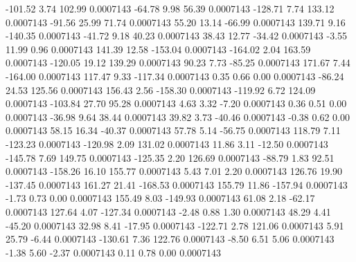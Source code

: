      -101.52        3.74      102.99     0.0007143
      -64.78        9.98       56.39     0.0007143
     -128.71        7.74      133.12     0.0007143
      -91.56       25.99       71.74     0.0007143
       55.20       13.14      -66.99     0.0007143
      139.71        9.16     -140.35     0.0007143
      -41.72        9.18       40.23     0.0007143
       38.43       12.77      -34.42     0.0007143
       -3.55       11.99        0.96     0.0007143
      141.39       12.58     -153.04     0.0007143
     -164.02        2.04      163.59     0.0007143
     -120.05       19.12      139.29     0.0007143
       90.23        7.73      -85.25     0.0007143
      171.67        7.44     -164.00     0.0007143
      117.47        9.33     -117.34     0.0007143
        0.35        0.66        0.00     0.0007143
      -86.24       24.53      125.56     0.0007143
      156.43        2.56     -158.30     0.0007143
     -119.92        6.72      124.09     0.0007143
     -103.84       27.70       95.28     0.0007143
        4.63        3.32       -7.20     0.0007143
        0.36        0.51        0.00     0.0007143
      -36.98        9.64       38.44     0.0007143
       39.82        3.73      -40.46     0.0007143
       -0.38        0.62        0.00     0.0007143
       58.15       16.34      -40.37     0.0007143
       57.78        5.14      -56.75     0.0007143
      118.79        7.11     -123.23     0.0007143
     -120.98        2.09      131.02     0.0007143
       11.86        3.11      -12.50     0.0007143
     -145.78        7.69      149.75     0.0007143
     -125.35        2.20      126.69     0.0007143
      -88.79        1.83       92.51     0.0007143
     -158.26       16.10      155.77     0.0007143
        5.43        7.01        2.20     0.0007143
      126.76       19.90     -137.45     0.0007143
      161.27       21.41     -168.53     0.0007143
      155.79       11.86     -157.94     0.0007143
       -1.73        0.73        0.00     0.0007143
      155.49        8.03     -149.93     0.0007143
       61.08        2.18      -62.17     0.0007143
      127.64        4.07     -127.34     0.0007143
       -2.48        0.88        1.30     0.0007143
       48.29        4.41      -45.20     0.0007143
       32.98        8.41      -17.95     0.0007143
     -122.71        2.78      121.06     0.0007143
        5.91       25.79       -6.44     0.0007143
     -130.61        7.36      122.76     0.0007143
       -8.50        6.51        5.06     0.0007143
       -1.38        5.60       -2.37     0.0007143
        0.11        0.78        0.00     0.0007143
